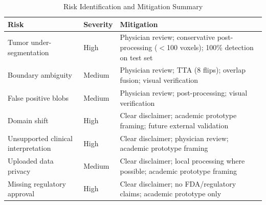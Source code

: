 
\begin{table}[!t]
\caption{Risk Identification and Mitigation Summary}
\label{tab:risk_mitigation}
\centering
\begin{tabular}{@{}p{2.6cm}p{2.2cm}p{4.2cm}@{}}
\toprule
\textbf{Risk} & \textbf{Severity} & \textbf{Mitigation} \\
\midrule
Tumor under-segmentation & High & Physician review; conservative post-processing ($<$100 voxels); 100\% detection on test set \\
Boundary ambiguity & Medium & Physician review; TTA (8 flips); overlap fusion; visual verification \\
False positive blobs & Medium & Physician review; post-processing; visual verification \\
Domain shift & High & Clear disclaimer; academic prototype framing; future external validation \\
Unsupported clinical interpretation & High & Clear disclaimer; physician review; academic prototype framing \\
Uploaded data privacy & Medium & Clear disclaimer; local processing where possible; academic prototype framing \\
Missing regulatory approval & High & Clear disclaimer; no FDA/regulatory claims; academic prototype only \\
\bottomrule
\end{tabular}
\end{table}
